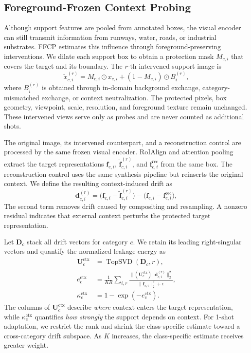 \subsection{Foreground-Frozen Context Probing}
\label{sec:ffcp}

Although support features are pooled from annotated boxes, the visual encoder can still transmit information from runways, water, roads, or industrial substrates. FFCP estimates this influence through foreground-preserving interventions. We dilate each support box to obtain a protection mask $M_{c,i}$ that covers the target and its boundary. The $r$-th intervened support image is
\begin{equation}
\tilde x_{c,i}^{(r)}
=M_{c,i}\odot x_{c,i}
+(1-M_{c,i})\odot B_i^{(r)},
\label{eq:counterfactual}
\end{equation}
where $B_i^{(r)}$ is obtained through in-domain background exchange, category-mismatched exchange, or context neutralization. The protected pixels, box geometry, viewpoint, scale, resolution, and foreground texture remain unchanged. These intervened views serve only as probes and are never counted as additional shots.

The original image, its intervened counterpart, and a reconstruction control are processed by the same frozen visual encoder. RoIAlign and attention pooling extract the target representations $\mathbf f_{c,i}$, $\tilde{\mathbf f}_{c,i}^{(r)}$, and $\mathbf f_{c,i}^{\mathrm{rec}}$ from the same box. The reconstruction control uses the same synthesis pipeline but reinserts the original context. We define the resulting context-induced drift as
\begin{equation}
\mathbf d_{c,i}^{(r)}
=\big(\mathbf f_{c,i}-\tilde{\mathbf f}_{c,i}^{(r)}\big)
-\big(\mathbf f_{c,i}-\mathbf f_{c,i}^{\mathrm{rec}}\big),
\label{eq:context_drift}
\end{equation}
The second term removes drift caused by compositing and resampling. A nonzero residual indicates that external context perturbs the protected target representation.

Let $\mathbf D_c$ stack all drift vectors for category $c$. We retain its leading right-singular vectors and quantify the normalized leakage energy as
\begin{equation}
\begin{aligned}
\mathbf U_c^{\mathrm{ctx}}
&=\operatorname{TopSVD}(\mathbf D_c,r),\\
e_c^{\mathrm{ctx}}
&=\frac{1}{KR}\sum_{i,r}
\frac{\|({\mathbf U_c^{\mathrm{ctx}}})^\top
\mathbf d_{c,i}^{(r)}\|_2^2}
{\|\mathbf f_{c,i}\|_2^2+\epsilon},\\
\kappa_c^{\mathrm{ctx}}
&=1-\exp(-e_c^{\mathrm{ctx}}).
\end{aligned}
\label{eq:context_subspace}
\end{equation}
The columns of $\mathbf U_c^{\mathrm{ctx}}$ describe \emph{where} context enters the target representation, while $\kappa_c^{\mathrm{ctx}}$ quantifies \emph{how strongly} the support depends on context. For 1-shot adaptation, we restrict the rank and shrink the class-specific estimate toward a cross-category drift subspace. As $K$ increases, the class-specific estimate receives greater weight.

